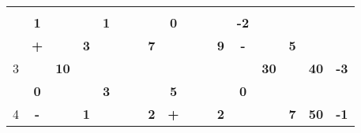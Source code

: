 \documentclass[a4paper, 12pt]{article}
\begin{document}
\begin{table}[H]
\begin{tabular}{|c|cccc|cccc|cccc|cccc|rr|}
          &       & \multicolumn{2}{c}{} &       &       & \multicolumn{2}{c}{} &       &       & \multicolumn{2}{c}{} &       &       & \multicolumn{2}{c}{} &       & \multicolumn{1}{c|}{} &  \bigstrut[b]\\
\cline{2-2}\cline{6-6}\cline{10-10}\cline{14-14}          & \multicolumn{1}{c|}{\textbf{1}} &       &       &       & \multicolumn{1}{c|}{\textbf{1}} &       &       &       & \multicolumn{1}{c|}{\textbf{0}} &       &       &       & \multicolumn{1}{c|}{\textbf{-2}} & \multicolumn{2}{c}{} &       & \multicolumn{1}{c|}{} &  \bigstrut\\
    \hline
    \multirow{4}[6]{*}{3} & \multicolumn{1}{c|}{\cellcolor[rgb]{ 1,  0,  0}\textbf{+}} &       & \multicolumn{1}{r|}{} & \cellcolor[rgb]{ 1,  1,  0}\textbf{3} &       &       & \multicolumn{1}{r|}{} & \textbf{7} &       & \multicolumn{2}{c|}{} & \textbf{9} & \multicolumn{1}{c|}{\cellcolor[rgb]{ 1,  0,  0}\textbf{-}} &       & \multicolumn{1}{r|}{} & \cellcolor[rgb]{ 1,  1,  0}\textbf{5} & \multicolumn{1}{c|}{\multirow{4}[6]{*}{\textbf{40}}} & \multicolumn{1}{c|}{\multirow{4}[6]{*}{\textbf{-3}}} \bigstrut\\
\cline{2-2}\cline{5-5}\cline{9-9}\cline{13-14}\cline{17-17}          &       & \multicolumn{2}{c}{\multirow{2}[2]{*}{\textbf{10}}} &       &       & \multicolumn{2}{c}{\multirow{2}[2]{*}{}} & \multirow{3}[4]{*}{} &       & \multicolumn{2}{c}{\multirow{2}[2]{*}{}} &       &       & \multicolumn{2}{c}{\multirow{2}[2]{*}{\textbf{30}}} &       & \multicolumn{1}{c|}{} &  \bigstrut[t]\\
          &       & \multicolumn{2}{c}{} &       &       & \multicolumn{2}{c}{} &       &       & \multicolumn{2}{c}{} &       &       & \multicolumn{2}{c}{} &       & \multicolumn{1}{c|}{} &  \bigstrut[b]\\
\cline{2-2}\cline{6-6}\cline{10-10}\cline{14-14}          & \multicolumn{1}{c|}{\textbf{0}} & \multicolumn{2}{c}{} &       & \multicolumn{1}{c|}{\textbf{3}} & \multicolumn{2}{c}{} &       & \multicolumn{1}{c|}{\textbf{5}} &       &       &       & \multicolumn{1}{c|}{\textbf{0}} & \multicolumn{2}{c}{} &       & \multicolumn{1}{c|}{} &  \bigstrut\\
    \hline
    \multirow{4}[6]{*}{4} & \multicolumn{1}{c|}{\cellcolor[rgb]{ 1,  0,  0}\textbf{-}} &       & \multicolumn{1}{r|}{} & \cellcolor[rgb]{ 1,  1,  0}\textbf{1} &       &       & \multicolumn{1}{r|}{} & \cellcolor[rgb]{ 1,  .753,  0}\textbf{2} & \multicolumn{1}{c|}{\cellcolor[rgb]{ 1,  0,  0}\textbf{+}} &       & \multicolumn{1}{r|}{} & \cellcolor[rgb]{ 1,  1,  0}\textbf{2} &       &       & \multicolumn{1}{r|}{} & \textbf{7} & \multicolumn{1}{c|}{\multirow{4}[6]{*}{\textbf{50}}} & \multicolumn{1}{c|}{\multirow{4}[6]{*}{\textbf{-1}}} \bigstrut\\

\end{tabular}
\end{table}
\end{document}
